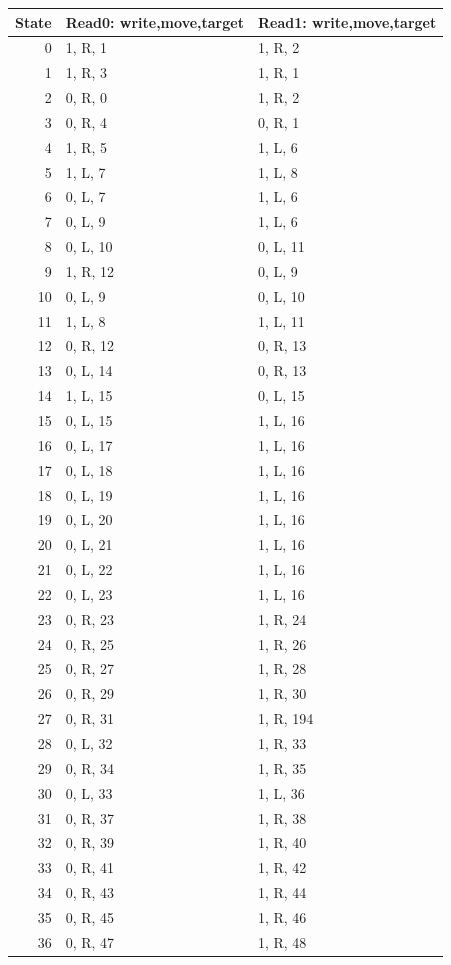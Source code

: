 \begin{longtable}{@{}rll@{}}
\toprule State & Read0: write,move,target & Read1: write,move,target\\\midrule\endhead
0 & 1, R, 1 & 1, R, 2\\
1 & 1, R, 3 & 1, R, 1\\
2 & 0, R, 0 & 1, R, 2\\
3 & 0, R, 4 & 0, R, 1\\
4 & 1, R, 5 & 1, L, 6\\
5 & 1, L, 7 & 1, L, 8\\
6 & 0, L, 7 & 1, L, 6\\
7 & 0, L, 9 & 1, L, 6\\
8 & 0, L, 10 & 0, L, 11\\
9 & 1, R, 12 & 0, L, 9\\
10 & 0, L, 9 & 0, L, 10\\
11 & 1, L, 8 & 1, L, 11\\
12 & 0, R, 12 & 0, R, 13\\
13 & 0, L, 14 & 0, R, 13\\
14 & 1, L, 15 & 0, L, 15\\
15 & 0, L, 15 & 1, L, 16\\
16 & 0, L, 17 & 1, L, 16\\
17 & 0, L, 18 & 1, L, 16\\
18 & 0, L, 19 & 1, L, 16\\
19 & 0, L, 20 & 1, L, 16\\
20 & 0, L, 21 & 1, L, 16\\
21 & 0, L, 22 & 1, L, 16\\
22 & 0, L, 23 & 1, L, 16\\
23 & 0, R, 23 & 1, R, 24\\
24 & 0, R, 25 & 1, R, 26\\
25 & 0, R, 27 & 1, R, 28\\
26 & 0, R, 29 & 1, R, 30\\
27 & 0, R, 31 & 1, R, 194\\
28 & 0, L, 32 & 1, R, 33\\
29 & 0, R, 34 & 1, R, 35\\
30 & 0, L, 33 & 1, L, 36\\
31 & 0, R, 37 & 1, R, 38\\
32 & 0, R, 39 & 1, R, 40\\
33 & 0, R, 41 & 1, R, 42\\
34 & 0, R, 43 & 1, R, 44\\
35 & 0, R, 45 & 1, R, 46\\
36 & 0, R, 47 & 1, R, 48\\

\end{longtable}
